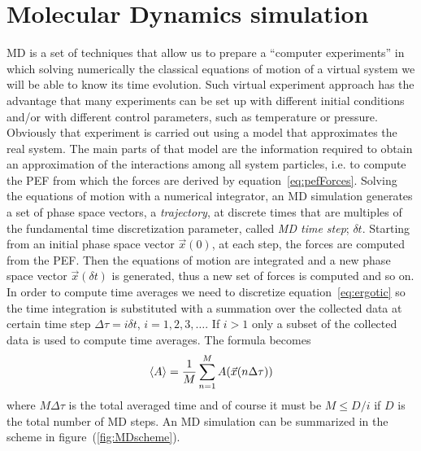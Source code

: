\section{Molecular Dynamics simulation}
\label{sec:MD}
\acf{MD} is a set of techniques that allow us to prepare a ``computer experiments'' in which solving numerically 
the classical equations of motion of a virtual system we will be able to know its time evolution. Such virtual 
experiment approach has the advantage that many experiments can be set up with different initial conditions 
and/or with different control parameters, such as temperature or pressure. Obviously that experiment is carried 
out using a model that approximates the real system. The main parts of that model are the information required to 
obtain an approximation of the interactions among all system particles, i.e. to compute the \ac{PEF} from which 
the forces are derived by equation~\eqref{eq:pefForces}. Solving the equations of motion with a numerical 
integrator, an \ac{MD} simulation generates a set of phase space vectors, a \textit{trajectory}, at discrete 
times that are multiples of the fundamental time discretization parameter, called \textit{MD time step}; 
$\delta t$. Starting from an initial phase space vector $\vec x(0)$, at each step, the forces are computed from 
the \ac{PEF}. Then the equations of motion are integrated and a new phase space vector $\vec x(\delta t)$ is 
generated, thus a new set of forces is computed and so on. In order to compute time averages we need to 
discretize equation~\eqref{eq:ergotic} so the time integration is substituted with a summation over the collected 
data at certain time step $\Delta \tau = i \delta t$, $i=1,2,3,\dots$. If $i > 1$ only a subset of the collected 
data is used to compute time averages. The formula becomes
\begin{equation}
	\left \langle A \right \rangle = \frac{1}{M}\sum_{n=1}^M A(\vec x(n\Delta \tau))
	\label{eq:MDTimeAve}
\end{equation}
where $M\Delta \tau$ is the total averaged time and of course it must be $M \le D/i$ if $D$ is the total number 
of \ac{MD} steps. An \ac{MD} simulation can be summarized in the scheme in figure~(\ref{fig:MDscheme}).
